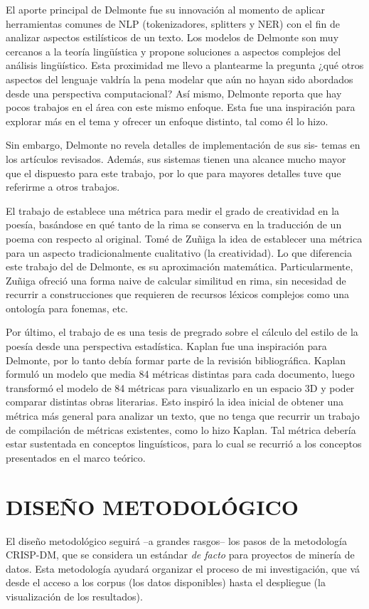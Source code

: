 \documentclass[12pt,letterpaper,twoside]{article}
\begin{document}
El aporte principal de Delmonte fue su innovación al momento de aplicar
herramientas comunes de NLP (tokenizadores, splitters y NER) con el fin
de analizar aspectos estilísticos de un texto. Los modelos de Delmonte
son muy cercanos a la teoría lingüística y propone soluciones a aspectos
complejos del análisis lingüístico. Esta proximidad me llevo a
plantearme la pregunta ¿qué otros aspectos del lenguaje valdría la pena
modelar que aún no hayan sido abordados desde una perspectiva
computacional? Así mismo, Delmonte reporta que hay pocos trabajos en el
área con este mismo enfoque. Esta fue una inspiración para explorar más
en el tema y ofrecer un enfoque distinto, tal como él lo hizo.

Sin embargo, Delmonte no revela detalles de implementación de sus sis-
temas en los artículos revisados. Además, sus sistemas tienen una
alcance mucho mayor que el dispuesto para este trabajo, por lo que para
mayores detalles tuve que referirme a otros trabajos.

El trabajo de \cite{zuniga2017automatic} establece una métrica para
medir el grado de creatividad en la poesía, basándose en qué tanto de
la rima se conserva en la traducción de un poema con respecto al
original. Tomé de Zuñiga la idea de establecer una métrica para un
aspecto tradicionalmente cualitativo (la creatividad). Lo que
diferencia este trabajo del de Delmonte, es su aproximación
matemática. Particularmente, Zuñiga ofreció una forma naive de
calcular similitud en rima, sin necesidad de recurrir a construcciones
que requieren de recursos léxicos complejos como una ontología para
fonemas, etc.

Por último, el trabajo de \cite{kaplan2006computational} es una tesis
de pregrado sobre el cálculo del estilo de la poesía desde una
perspectiva estadística. Kaplan fue una inspiración para Delmonte, por
lo tanto debía formar parte de la revisión bibliográfica. Kaplan
formuló un modelo que media 84 métricas distintas para cada documento,
luego transformó el modelo de 84 métricas para visualizarlo en un
espacio 3D y poder comparar distintas obras literarias. Esto inspiró
la idea inicial de obtener una métrica más general para analizar un
texto, que no tenga que recurrir un trabajo de compilación de métricas
existentes, como lo hizo Kaplan. Tal métrica debería estar sustentada
en conceptos linguísticos, para lo cual se recurrió a  los conceptos
presentados en el marco teórico.

\section{DISEÑO METODOLÓGICO}
\label{sec:orgbf593d6}
El diseño metodológico seguirá --a grandes rasgos-- los pasos de la
metodología CRISP-DM, que se considera un estándar \emph{de facto} para
proyectos de minería de datos. Esta metodología ayudará organizar
el proceso de mi investigación, que vá desde el acceso a los corpus
(los datos disponibles) hasta el despliegue (la visualización de
los resultados).
\end{document}
